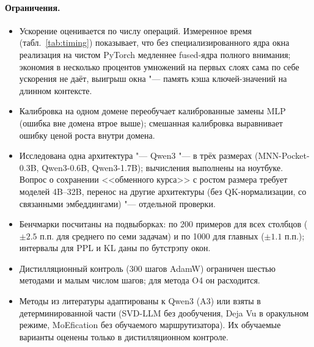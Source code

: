 \paragraph{Ограничения.}
\begin{itemize}
  \item Ускорение оценивается по числу операций. Измеренное время
    (табл.~\ref{tab:timing}) показывает, что без специализированного
    ядра окна реализация на чистом PyTorch медленнее fused-ядра полного
    внимания; экономия в несколько процентов умножений на первых слоях
    сама по себе ускорения не даёт, выигрыш окна "--- память кэша
    ключей-значений на длинном контексте.
  \item Калибровка на одном домене переобучает калиброванные замены MLP
    (ошибка вне домена втрое выше); смешанная калибровка выравнивает
    ошибку ценой роста внутри домена.
  \item Исследована одна архитектура "--- Qwen3 "--- в трёх размерах
    (MNN-Pocket-0.3B, Qwen3-0.6B, Qwen3-1.7B); вычисления выполнены на ноутбуке.
    Вопрос о сохранении <<обменного курса>> с ростом размера требует моделей
    4B--32B, перенос на другие архитектуры (без QK-нормализации, со связанными
    эмбеддингами) "--- отдельной проверки.
  \item Бенчмарки посчитаны на подвыборках: по 200 примеров для всех
    столбцов ($\pm2.5$ п.п. для среднего по семи задачам) и по 1000 для
    главных ($\pm1.1$ п.п.); интервалы для PPL и KL даны по бутстрэпу окон.
  \item Дистилляционный контроль (300 шагов AdamW) ограничен шестью
    методами и малым числом шагов; для метода O4 он расходится.
  \item Методы из литературы адаптированы к Qwen3 (A3) или взяты в
    детерминированной части (SVD-LLM без дообучения, Deja Vu в
    оракульном режиме, MoEfication без обучаемого маршрутизатора). Их
    обучаемые варианты оценены только в дистилляционном контроле.
\end{itemize}

